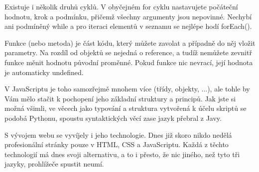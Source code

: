 Existuje i několik druhů cyklů. V obyčejném for cyklu nastavujete počáteční hodnotu, krok a podmínku, přičemž všechny argumenty jsou nepovinné. Nechybí ani podmíněný while a pro iteraci elementů v seznamu se nejlépe hodí forEach().

Funkce (nebo metoda) je část kódu, který můžete zavolat a případně do něj vložit parametry. Na rozdíl od objektů se nejedná o reference, a tudíž nemůžete zevnitř funkce měnit hodnotu původní proměnné. Pokud funkce nic nevrací, její hodnota je automaticky undefined.

V JavaScriptu je toho samozřejmě mnohem více (třídy, objekty, ...), ale tohle by Vám mělo stačit k pochopení jeho základní struktury a principů. Jak jste si možná všimli, ve věcech jako typování a struktura vytvořená k účelu skriptů se podobá Pythonu, spoustu syntaktických věcí zase jazyk přebral z Javy.

S vývojem webu se vyvíjely i jeho technologie. Dnes již skoro nikdo nedělá profesionální stránky pouze v HTML, CSS a JavaScriptu. Každá z těchto technologií má dnes svoji alternativu, a to i přesto, že nic jiného, než tyto tři jazyky, prohlížeče spustit neumí.